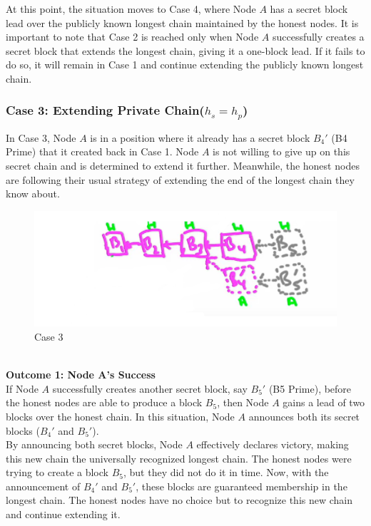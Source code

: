 At this point, the situation moves to Case 4, where Node $A$ has a secret block lead over the publicly known longest chain maintained by the honest nodes.
It is important to note that Case 2 is reached only when Node $A$ successfully creates a secret block that extends the longest chain, giving it a one-block lead. If it fails to do so, it will remain in Case 1 and continue extending the publicly known longest chain.

\subsubsection{Case 3: Extending Private Chain($h_s = h_p$)}

In Case 3, Node $A$ is in a position where it already has a secret block $B_{4}'$ (B4 Prime) that it created back in Case 1. Node $A$ is not willing to give up on this secret chain and is determined to extend it further. Meanwhile, the honest nodes are following their usual strategy of extending the end of the longest chain they know about.\\
\begin{figure}[h]
    \centering
    \includegraphics[scale = 0.5]{figures/f46.png}
    \caption{Case 3}
    \label{fig:mesh1}
\end{figure}\\
\noindent
\textbf{Outcome 1: Node A's Success}\\
If Node $A$ successfully creates another secret block, say $B_{5}'$ (B5 Prime), before the honest nodes are able to produce a block $B_{5}$, then Node $A$ gains a lead of two blocks over the honest chain. In this situation, Node $A$ announces both its secret blocks ($B_{4}'$ and $B_{5}'$).\\

By announcing both secret blocks, Node $A$ effectively declares victory, making this new chain the universally recognized longest chain. The honest nodes were trying to create a block $B_{5}$, but they did not do it in time. Now, with the announcement of $B_{4}'$ and $B_{5}'$, these blocks are guaranteed membership in the longest chain. The honest nodes have no choice but to recognize this new chain and continue extending it.

